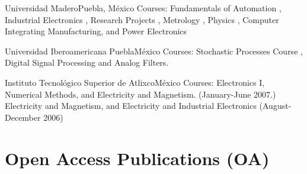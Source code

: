 \documentclass[10pt,a4paper,roman]{moderncv}
\begin{document}
{Universidad Madero}{Puebla, M\'exico}{}
{Courses: Fundamentals of Automation
\href{https://sites.google.com/site/perezxochicale/digital-electronics}{\faExternalLink},
Industrial Electronics \href{https://sites.google.com/site/perezxochicale/ie}{\faExternalLink},
Research Projects \href{https://sites.google.com/site/perezxochicale/latex/thesistemplate}{\faExternalLink},
Metrology \href{https://sites.google.com/site/perezxochicale/metrology}{\faExternalLink},
Physics \href{http://goo.gl/fffnG}{\faExternalLink},
Computer Integrating Manufacturing, and Power Electronics
}

{Universidad Iberoamericana Puebla}{M\'exico}{}
{Courses: Stochastic Processes Course
\href{https://sites.google.com/site/perezxochicale/stochastic-processes-course}{\faExternalLink},
Digital Signal Processing
\href{https://sites.google.com/site/perezxochicale/digital-signal-processing-course}{\faExternalLink}
and Analog Filters.
}

{Instituto Tecnol\'ogico Superior de Atlixco}{M\'exico}{}
{Courses: Electronics I, Numerical Methods, and Electricity and Magnetism. (January-June 2007.)
Electricity and Magnetism, and Electricity and Industrial Electronics (August-December 2006)
}






\section{Open Access Publications (OA)}







\end{document}
